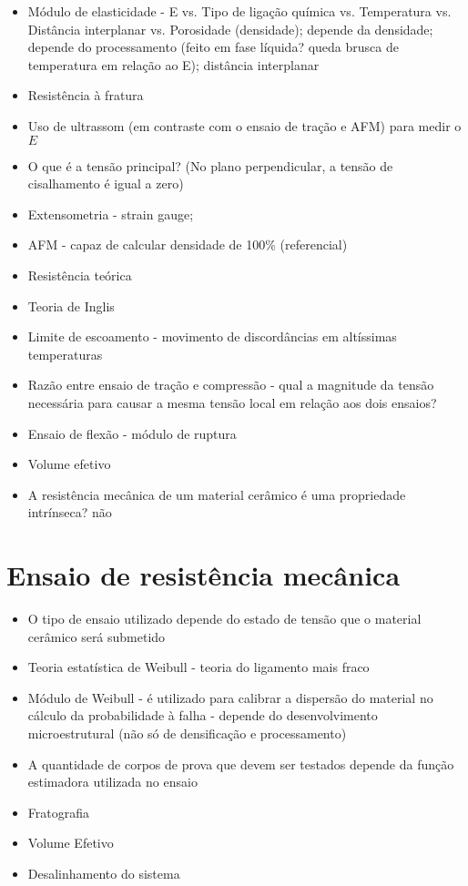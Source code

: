 \begin{multicols*}{2}
  \begin{itemize}
    \item Módulo de elasticidade - E vs. Tipo de ligação química vs. Temperatura vs. Distância interplanar vs. Porosidade (densidade); depende da densidade; depende do processamento (feito em fase líquida? queda brusca de temperatura em relação ao E); distância interplanar 
    \item Resistência à fratura
    \item Uso de ultrassom (em contraste com o ensaio de tração e AFM) para medir o $E$
    \item O que é a tensão principal? (No plano perpendicular, a tensão de cisalhamento é igual a zero)
    \item Extensometria - strain gauge;
    \item AFM - capaz de calcular densidade de 100\% (referencial)
    \item Resistência teórica
    \item Teoria de Inglis
    \item Limite de escoamento - movimento de discordâncias em altíssimas temperaturas
    \item Razão entre ensaio de tração e compressão - qual a magnitude da tensão necessária para causar a mesma tensão local em relação aos dois ensaios?
    \item Ensaio de flexão - módulo de ruptura
    \item Volume efetivo
    \item A resistência mecânica de um material cerâmico é uma propriedade intrínseca? não
  \end{itemize}

\section*{Ensaio de resistência mecânica}

  \begin{itemize}
    \item O tipo de ensaio utilizado depende do estado de tensão que o material cerâmico será submetido
    \item Teoria estatística de Weibull - teoria do ligamento mais fraco 
    \item Módulo de Weibull - é utilizado para calibrar a dispersão do material no cálculo da probabilidade à falha - depende do desenvolvimento microestrutural (não só de densificação e processamento)
    \item A quantidade de corpos de prova que devem ser testados depende da função estimadora utilizada no ensaio
    \item Fratografia
    \item Volume Efetivo
    \item Desalinhamento do sistema
  \end{itemize}

\end{multicols*}

